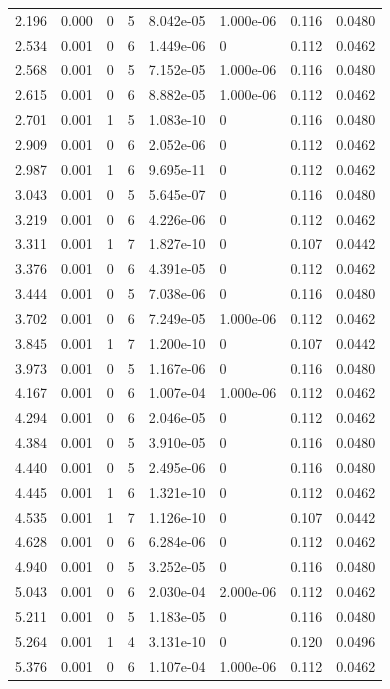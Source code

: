 \documentclass[preview]{standalone}
\begin{document}
{{\begin{tabular}{L{1.2cm}C{1.2cm} C{0.3cm}C{0.5cm} C{1.4cm}C{1.4cm} C{1.4cm}C{1.4cm}}
  2.196  &  0.000  & 0     &  5 &  8.042e-05  & 1.000e-06  & 0.116 &  0.0480   \\ 
  2.534  &  0.001  & 0     &  6 &  1.449e-06  & 0  & 0.112 &  0.0462   \\ 
  2.568  &  0.001  & 0     &  5 &  7.152e-05  & 1.000e-06  & 0.116 &  0.0480   \\ 
  2.615  &  0.001  & 0     &  6 &  8.882e-05  & 1.000e-06  & 0.112 &  0.0462   \\ 
  2.701  &  0.001  & 1     &  5 &  1.083e-10  & 0  & 0.116 &  0.0480   \\ 
  2.909  &  0.001  & 0     &  6 &  2.052e-06  & 0  & 0.112 &  0.0462   \\ 
  2.987  &  0.001  & 1     &  6 &  9.695e-11  & 0  & 0.112 &  0.0462   \\ 
  3.043  &  0.001  & 0     &  5 &  5.645e-07  & 0  & 0.116 &  0.0480   \\ 
  3.219  &  0.001  & 0     &  6 &  4.226e-06  & 0  & 0.112 &  0.0462   \\ 
  3.311  &  0.001  & 1     &  7 &  1.827e-10  & 0  & 0.107 &  0.0442   \\ 
  3.376  &  0.001  & 0     &  6 &  4.391e-05  & 0  & 0.112 &  0.0462   \\ 
  3.444  &  0.001  & 0     &  5 &  7.038e-06  & 0  & 0.116 &  0.0480   \\ 
  3.702  &  0.001  & 0     &  6 &  7.249e-05  & 1.000e-06  & 0.112 &  0.0462   \\ 
  3.845  &  0.001  & 1     &  7 &  1.200e-10  & 0  & 0.107 &  0.0442   \\ 
  3.973  &  0.001  & 0     &  5 &  1.167e-06  & 0  & 0.116 &  0.0480   \\ 
  4.167  &  0.001  & 0     &  6 &  1.007e-04  & 1.000e-06  & 0.112 &  0.0462   \\ 
  4.294  &  0.001  & 0     &  6 &  2.046e-05  & 0  & 0.112 &  0.0462   \\ 
  4.384  &  0.001  & 0     &  5 &  3.910e-05  & 0  & 0.116 &  0.0480   \\ 
  4.440  &  0.001  & 0     &  5 &  2.495e-06  & 0  & 0.116 &  0.0480   \\ 
  4.445  &  0.001  & 1     &  6 &  1.321e-10  & 0  & 0.112 &  0.0462   \\ 
  4.535  &  0.001  & 1     &  7 &  1.126e-10  & 0  & 0.107 &  0.0442   \\ 
  4.628  &  0.001  & 0     &  6 &  6.284e-06  & 0  & 0.112 &  0.0462   \\ 
  4.940  &  0.001  & 0     &  5 &  3.252e-05  & 0  & 0.116 &  0.0480   \\ 
  5.043  &  0.001  & 0     &  6 &  2.030e-04  & 2.000e-06  & 0.112 &  0.0462   \\ 
  5.211  &  0.001  & 0     &  5 &  1.183e-05  & 0  & 0.116 &  0.0480   \\ 
  5.264  &  0.001  & 1     &  4 &  3.131e-10  & 0  & 0.120 &  0.0496   \\ 
  5.376  &  0.001  & 0     &  6 &  1.107e-04  & 1.000e-06  & 0.112 &  0.0462   \\ 
\hline 
\end{tabular} 

}}
\end{document}
